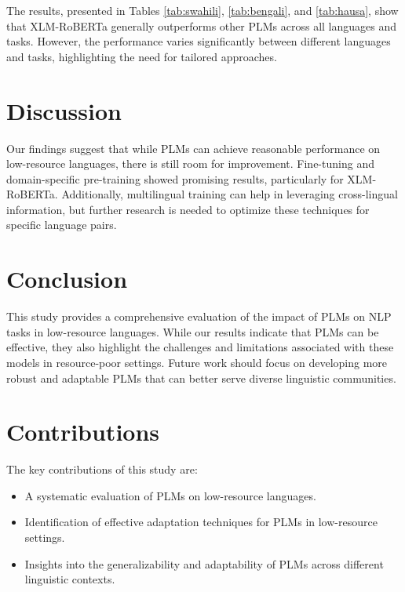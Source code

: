 \documentclass{article}
\begin{document}
The results, presented in Tables \ref{tab:swahili}, \ref{tab:bengali}, and \ref{tab:hausa}, show that XLM-RoBERTa generally outperforms other PLMs across all languages and tasks. However, the performance varies significantly between different languages and tasks, highlighting the need for tailored approaches.

\section{Discussion}
Our findings suggest that while PLMs can achieve reasonable performance on low-resource languages, there is still room for improvement. Fine-tuning and domain-specific pre-training showed promising results, particularly for XLM-RoBERTa. Additionally, multilingual training can help in leveraging cross-lingual information, but further research is needed to optimize these techniques for specific language pairs.

\section{Conclusion}
This study provides a comprehensive evaluation of the impact of PLMs on NLP tasks in low-resource languages. While our results indicate that PLMs can be effective, they also highlight the challenges and limitations associated with these models in resource-poor settings. Future work should focus on developing more robust and adaptable PLMs that can better serve diverse linguistic communities.

\section{Contributions}
The key contributions of this study are:
\begin{itemize}
    \item A systematic evaluation of PLMs on low-resource languages.
    \item Identification of effective adaptation techniques for PLMs in low-resource settings.
    \item Insights into the generalizability and adaptability of PLMs across different linguistic contexts.
\end{itemize}



\end{document}
